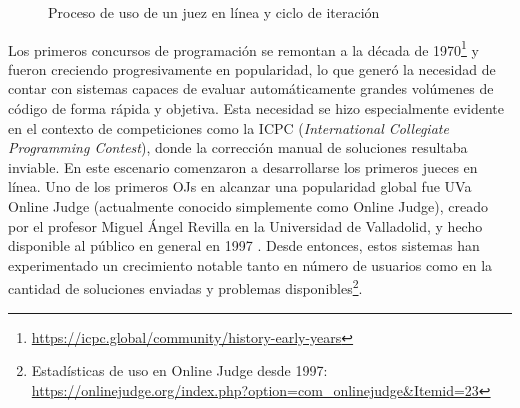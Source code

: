 \begin{figure}[h]
\centering
{}

\caption{Proceso de uso de un juez en línea y ciclo de iteración}
\label{fig:online-judge-process}
\end{figure}

Los primeros concursos de programación se remontan a la década de 1970\footnote{\url{https://icpc.global/community/history-early-years}} y fueron creciendo progresivamente en popularidad, lo que generó la necesidad de contar con sistemas capaces de evaluar automáticamente grandes volúmenes de código de forma rápida y objetiva. Esta necesidad se hizo especialmente evidente en el contexto de competiciones como la ICPC (\textit{International Collegiate Programming Contest}), donde la corrección manual de soluciones resultaba inviable. En este escenario comenzaron a desarrollarse los primeros jueces en línea. Uno de los primeros OJs en alcanzar una popularidad global fue UVa Online Judge (actualmente conocido simplemente como Online Judge), creado por el profesor Miguel Ángel Revilla en la Universidad de Valladolid, y hecho disponible al público en general en 1997 \citep{Revilla_Manzoor_Liu_2008}. Desde entonces, estos sistemas han experimentado un crecimiento notable tanto en número de usuarios como en la cantidad de soluciones enviadas y problemas disponibles\footnote{Estadísticas de uso en Online Judge desde 1997: \url{https://onlinejudge.org/index.php?option=com_onlinejudge&Itemid=23}}.

